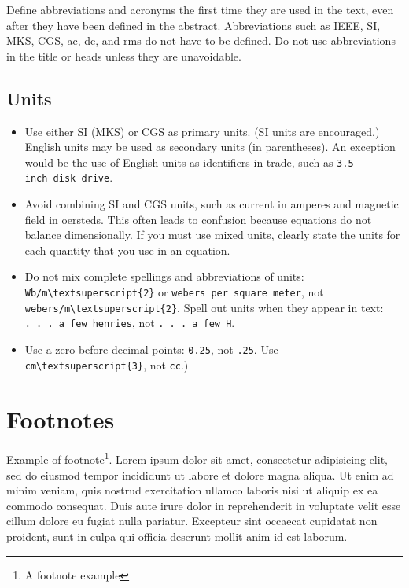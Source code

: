 \documentclass[conference]{IEEEtran}
\providecommand{\tightlist}{%
  \setlength{\itemsep}{0pt}\setlength{\parskip}{0pt}}
\begin{document}
Define abbreviations and acronyms the first time they are used in the
text, even after they have been defined in the abstract. Abbreviations
such as IEEE, SI, MKS, CGS, ac, dc, and rms do not have to be defined.
Do not use abbreviations in the title or heads unless they are
unavoidable.

\subsection{Units}\label{units}

\begin{itemize}
\tightlist
\item
  Use either SI (MKS) or CGS as primary units. (SI units are
  encouraged.) English units may be used as secondary units (in
  parentheses). An exception would be the use of English units as
  identifiers in trade, such as \texttt{3.5-inch\ disk\ drive}.
\item
  Avoid combining SI and CGS units, such as current in amperes and
  magnetic field in oersteds. This often leads to confusion because
  equations do not balance dimensionally. If you must use mixed units,
  clearly state the units for each quantity that you use in an equation.
\item
  Do not mix complete spellings and abbreviations of units:
  \texttt{Wb/m\textbackslash{}textsuperscript\{2\}} or
  \texttt{webers\ per\ square\ meter}, not
  \texttt{webers/m\textbackslash{}textsuperscript\{2\}}. Spell out units
  when they appear in text: \texttt{.\ .\ .\ a\ few\ henries}, not
  \texttt{.\ .\ .\ a\ few\ H}.
\item
  Use a zero before decimal points: \texttt{0.25}, not \texttt{.25}. Use
  \texttt{cm\textbackslash{}textsuperscript\{3\}}, not \texttt{cc}.)
\end{itemize}

\section{Footnotes}\label{footnotes}

Example of footnote\footnote{A footnote example}. Lorem ipsum dolor sit
amet, consectetur adipisicing elit, sed do eiusmod tempor incididunt ut
labore et dolore magna aliqua. Ut enim ad minim veniam, quis nostrud
exercitation ullamco laboris nisi ut aliquip ex ea commodo consequat.
Duis aute irure dolor in reprehenderit in voluptate velit esse cillum
dolore eu fugiat nulla pariatur. Excepteur sint occaecat cupidatat non
proident, sunt in culpa qui officia deserunt mollit anim id est laborum.
\end{document}
